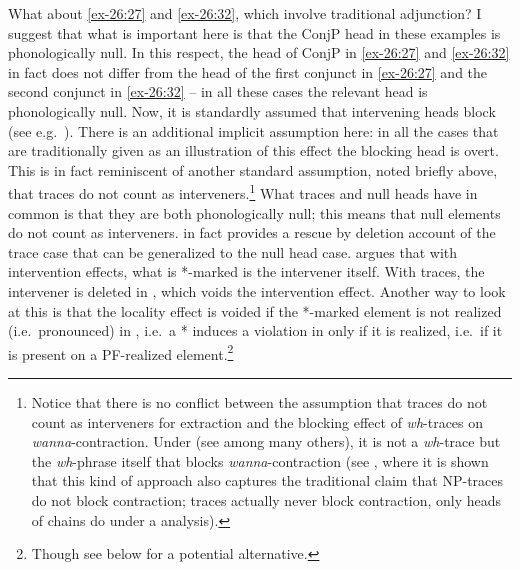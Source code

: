 \documentclass[output=paper]{langsci/langscibook}
\begin{document}
What about \eqref{ex-26:27} and \eqref{ex-26:32}, which involve traditional adjunction? I suggest that
what is important here is that the ConjP head in these examples is
phonologically null. In this respect, the head of ConjP in \eqref{ex-26:27} and \eqref{ex-26:32} in
fact does not differ from the head of the first conjunct in \eqref{ex-26:27} and the second
conjunct in \eqref{ex-26:32} – in all these cases the relevant head is phonologically null.
Now, it is standardly assumed that intervening heads block  (see
e.g.\ \citealt{Roberts2010}). There is an additional implicit assumption here:
in all the cases that are traditionally given as an illustration of this effect
the blocking head is overt. This is in fact reminiscent of another standard
assumption, noted briefly above, that traces do not count as
interveners.\footnote{ Notice that there is no conflict between the assumption
    that traces do not count as interveners for extraction and the blocking
    effect of \emph{wh}-traces on \emph{wanna}-contraction. Under  (see \citealt{Uriagereka1999,Epstein1999,Chomsky2000,Chomsky2001}
    among many others), it is not a \emph{wh}-trace but the \emph{wh}-phrase
    itself that blocks \emph{wanna}-contraction (see \citealt{Boskovic2013c},
    where it is shown that this kind of approach also captures the traditional
    claim that NP-traces do not block contraction; traces actually never block
contraction, only heads of chains do under a  analysis).}
What traces and null heads have in common is that they are both phonologically
null; this means that null elements do not count as interveners.
\textcite{Boskovic2011} in fact provides a rescue by  deletion account of the
trace case that can be generalized to the null head case.
\textcite{Boskovic2011} argues that with intervention effects, what is *-marked
is the intervener itself. With traces, the intervener is deleted in , which
voids the intervention effect.  Another way to look at this is that the
locality effect is voided if the *-marked element is not realized (i.e.\
pronounced) in , i.e.\ a * induces a violation in  only if it is 
realized, i.e.\ if it is present on a PF-realized element.\footnote{Though see
below for a potential alternative.}
\end{document}
